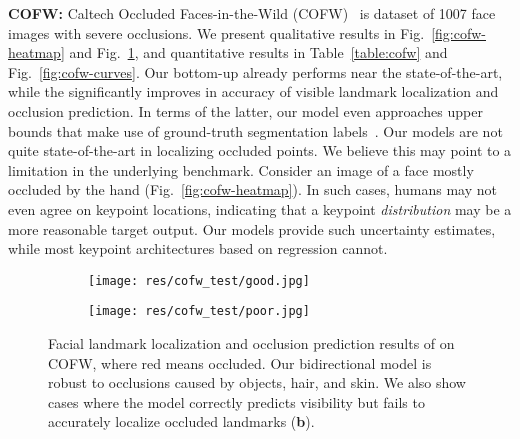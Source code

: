 \documentclass[10pt,twocolumn,letterpaper]{article}
\newcommand{\QP}[1]{{}}
\begin{document}
{\bf COFW:} Caltech Occluded Faces-in-the-Wild
(COFW)~\cite{burgos2013robust} is dataset of 1007 face images with
severe occlusions. We present qualitative results in
Fig.~\ref{fig:cofw-heatmap} and Fig.~\ref{fig:cofw}, and quantitative
results in Table~\ref{table:cofw} and Fig.~\ref{fig:cofw-curves}. Our
bottom-up \QP{1} already performs near the state-of-the-art, while the
\QP{2} significantly improves in accuracy of visible landmark
localization and occlusion prediction. In terms of the latter, our
model even approaches upper bounds that make use of ground-truth
segmentation labels~\cite{ghiasi2015sapm}. Our models are not quite
state-of-the-art in localizing occluded points. We believe this may
point to a limitation in the underlying benchmark.  Consider an image
of a face mostly occluded by the hand
(Fig.~\ref{fig:cofw-heatmap}). In such cases, humans may not even
agree on keypoint locations, indicating that a keypoint {\em
  distribution} may be a more reasonable target output. Our models
provide such uncertainty estimates, while most keypoint architectures
based on regression cannot.

\begin{figure}[t!]
  \centering
  \begin{subfigure}{.75\linewidth}
    \texttt{[image: res/cofw\_test/good.jpg]}
    \caption{}
  \end{subfigure}
  \begin{subfigure}{.1925\linewidth}
    \texttt{[image: res/cofw\_test/poor.jpg]}
    \caption{}
  \end{subfigure}
\caption{Facial landmark localization and occlusion prediction
    results of \QP{2} on COFW, where red means occluded. Our bidirectional
    model is robust to occlusions caused by objects, hair, and
    skin. We also show cases where the model correctly predicts visibility but fails to accurately localize occluded landmarks ({\bf b}).}
  \label{fig:cofw}
\end{figure}
\end{document}
